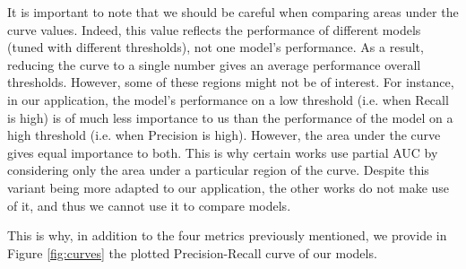 \documentclass[11pt,a4paper]{article}
\begin{document}
It is important to note that we should be careful when comparing areas under the curve values. Indeed, this value reflects the performance of different models (tuned with different thresholds), not one model's performance. As a result, reducing the curve to a single number gives an average performance overall thresholds. However, some of these regions might not be of interest. For instance, in our application, the model's performance on a low threshold (i.e. when Recall is high) is of much less importance to us than the performance of the model on a high threshold (i.e. when Precision is high). However, the area under the curve gives equal importance to both. This is why certain works use partial AUC by considering only the area under a particular region of the curve. Despite this variant being more adapted to our application, the other works do not make use of it, and thus we cannot use it to compare models.

This is why, in addition to the four metrics previously mentioned, we provide in Figure \ref{fig:curves} the plotted Precision-Recall curve of our models.
\end{document}
